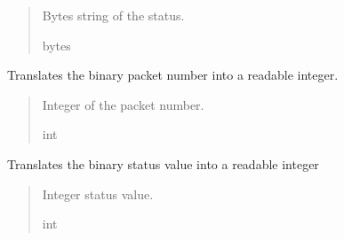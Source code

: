 \documentclass[letterpaper,10pt,english]{sphinxmanual}
\begin{document}
\begin{fulllineitems}
\begin{fulllineitems}
\begin{quote}
\begin{description}
\sphinxAtStartPar
Bytes string of the status.

\sphinxAtStartPar
bytes

\end{description}\end{quote}

\end{fulllineitems}


\begin{fulllineitems}
\label{\detokenize{PodApi.Packets:PodApi.Packets.Binary5.PacketBinary5.PacketNumber}}
\pysigstartsignatures
{}
\pysigstopsignatures
\sphinxAtStartPar
Translates the binary packet number into a readable integer.
\begin{quote}\begin{description}
\sphinxAtStartPar
Integer of the packet number.

\sphinxAtStartPar
int

\end{description}\end{quote}

\end{fulllineitems}


\begin{fulllineitems}
\label{\detokenize{PodApi.Packets:PodApi.Packets.Binary5.PacketBinary5.Status}}
\pysigstartsignatures
{}
\pysigstopsignatures
\sphinxAtStartPar
Translates the binary status value into a readable integer
\begin{quote}\begin{description}
\sphinxAtStartPar
Integer status value.

\sphinxAtStartPar
int

\end{description}\end{quote}

\end{fulllineitems}


\end{fulllineitems}
\end{document}
